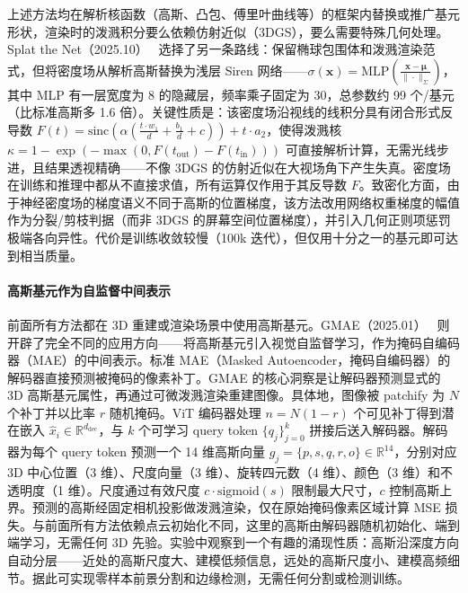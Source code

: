 上述方法均在解析核函数（高斯、凸包、傅里叶曲线等）的框架内替换或推广基元形状，渲染时的泼溅积分要么依赖仿射近似（3DGS），要么需要特殊几何处理。Splat the Net（2025.10）~\cite{2510_08491} 选择了另一条路线：保留椭球包围体和泼溅渲染范式，但将密度场从解析高斯替换为浅层 Siren 网络——$\sigma(\mathbf{x}) = \text{MLP}\left(\frac{\mathbf{x} - \boldsymbol{\mu}}{\|\cdot\|_\Sigma}\right)$，其中 MLP 有一层宽度为 8 的隐藏层，频率乘子固定为 30，总参数约 99 个/基元（比标准高斯多 1.6 倍）。关键性质是：该密度场沿视线的线积分具有闭合形式反导数 $F(t) = \text{sinc}\left(\alpha\left(\frac{t \cdot w_1}{d} + \frac{b_1}{d} + c\right)\right) + t \cdot a_2$，使得泼溅核 $\kappa = 1 - \exp(-\max(0, F(t_{\text{out}}) - F(t_{\text{in}})))$ 可直接解析计算，无需光线步进，且结果透视精确——不像 3DGS 的仿射近似在大视场角下产生失真。密度场在训练和推理中都从不直接求值，所有运算仅作用于其反导数 $F$。致密化方面，由于神经密度场的梯度语义不同于高斯的位置梯度，该方法改用网络权重梯度的幅值作为分裂/剪枝判据（而非 3DGS 的屏幕空间位置梯度），并引入几何正则项惩罚极端各向异性。代价是训练收敛较慢（100k 迭代），但仅用十分之一的基元即可达到相当质量。

\paragraph{高斯基元作为自监督中间表示}

前面所有方法都在 3D 重建或渲染场景中使用高斯基元。GMAE（2025.01）~\cite{2501_03229} 则开辟了完全不同的应用方向——将高斯基元引入视觉自监督学习，作为掩码自编码器（MAE）的中间表示。标准 MAE（Masked Autoencoder，掩码自编码器）的解码器直接预测被掩码的像素补丁。GMAE 的核心洞察是让解码器预测显式的 3D 高斯基元属性，再通过可微泼溅渲染重建图像。具体地，图像被 patchify 为 $N$ 个补丁并以比率 $r$ 随机掩码。ViT 编码器处理 $n = N(1-r)$ 个可见补丁得到潜在嵌入 $\hat{x}_i \in \mathbb{R}^{d_{\text{dec}}}$，与 $k$ 个可学习 query token $\{q_j\}_{j=0}^{k}$ 拼接后送入解码器。解码器为每个 query token 预测一个 14 维高斯向量 $g_j = \{p, s, q, r, o\} \in \mathbb{R}^{14}$，分别对应 3D 中心位置（3 维）、尺度向量（3 维）、旋转四元数（4 维）、颜色（3 维）和不透明度（1 维）。尺度通过有效尺度 $c \cdot \text{sigmoid}(s)$ 限制最大尺寸，$c$ 控制高斯上界。预测的高斯经固定相机投影做泼溅渲染，仅在原始掩码像素区域计算 MSE 损失。与前面所有方法依赖点云初始化不同，这里的高斯由解码器随机初始化、端到端学习，无需任何 3D 先验。实验中观察到一个有趣的涌现性质：高斯沿深度方向自动分层——近处的高斯尺度大、建模低频信息，远处的高斯尺度小、建模高频细节。据此可实现零样本前景分割和边缘检测，无需任何分割或检测训练。

